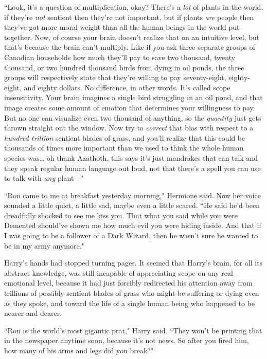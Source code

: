 ``Look, it's a question of multiplication, okay? There's a \emph{lot} of plants in the world, if they're \emph{not} sentient then they're not important, but if plants \emph{are} people then they've got more moral weight than all the human beings in the world put together. Now, of course your brain doesn't realize that on an intuitive level, but that's because the brain can't multiply. Like if you ask three separate groups of Canadian households how much they'll pay to save two thousand, twenty thousand, or two hundred thousand birds from dying in oil ponds, the three groups will respectively state that they're willing to pay seventy-eight, eighty-eight, and eighty dollars. No difference, in other words. It's called scope insensitivity. Your brain imagines a single bird struggling in an oil pond, and that image creates some amount of emotion that determines your willingness to pay. But no one can visualize even two thousand of anything, so the \emph{quantity} just gets thrown straight out the window. Now try to \emph{correct} that bias with respect to a \emph{hundred trillion} sentient blades of grass, and you'll realize that this could be thousands of times more important than we used to think the whole human species was{\ldots} oh thank Azathoth, this says it's just mandrakes that can talk and they speak regular human language out loud, not that there's a spell you can use to talk with \emph{any} plant---"

``Ron came to me at breakfast yesterday morning," Hermione said. Now her voice sounded a little quiet, a little sad, maybe even a little scared. ``He said he'd been dreadfully shocked to see me kiss you. That what you said while you were Demented should've shown me how much evil you were hiding inside. And that if I was going to be a follower of a Dark Wizard, then he wasn't sure he wanted to be in my army anymore."

Harry's hands had stopped turning pages. It seemed that Harry's brain, for all its abstract knowledge, was still incapable of appreciating scope on any real emotional level, because it had just forcibly redirected his attention away from trillions of possibly-sentient blades of grass who might be suffering or dying even as they spoke, and toward the life of a single human being who happened to be nearer and dearer.

``Ron is the world's most gigantic prat," Harry said. ``They won't be printing that in the newspaper anytime soon, because it's not news. So after you fired him, how many of his arms and legs did you break?"

